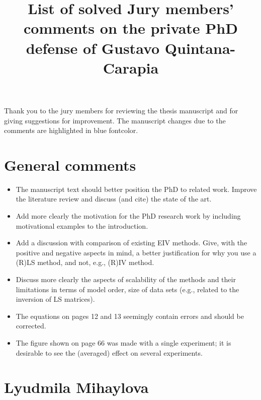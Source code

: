 \documentclass[11pt]{article}
\date{\vspace{-10ex}}
\begin{document}
\title{List of solved Jury members' comments on \linebreak the private PhD defense of Gustavo Quintana-Carapia} 

\maketitle

Thank you to the jury members for reviewing the thesis manuscript and for giving suggestions for improvement. 
The manuscript changes due to the comments are highlighted in \color{blue} blue fontcolor\color{black}.

\section*{General comments}

\begin{itemize}
	\item The manuscript text should better position the PhD to related work. Improve the literature review and discuss (and cite) the state of the art.
	
	
	\item  Add more clearly the motivation for the PhD research work by including motivational examples to the introduction.
	
	
	\item  Add a discussion with comparison of existing EIV methods. Give, with the positive and negative aspects in mind, a better justification for why you use a (R)LS method, and not, e.g., (R)IV method.
	
	\item  Discuss more clearly the aspects of scalability of the methods and their limitations in terms of model order, size of data sets (e.g., related to the inversion of LS matrices).
	
	\item  The equations on pages 12 and 13 seemingly contain errors and should be corrected.
	
	\item  The figure shown on page 66 was made with a single experiment; it is desirable to see the (averaged) effect on several experiments.
	

	
\end{itemize}

\section*{Lyudmila Mihaylova}
\end{document}
